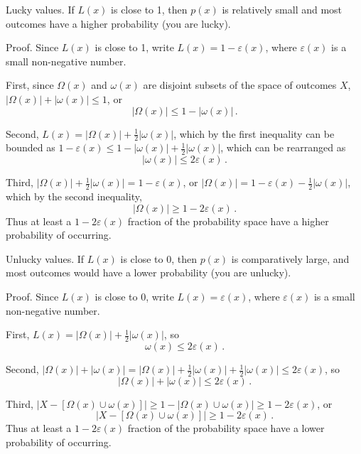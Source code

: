\begin{theorem}{Lucky values.}
\label{thm:lucky}
If $L(x)$ is close to 1, then $p(x)$ is relatively small and most outcomes have a higher probability (you are lucky).

Proof.  Since $L(x)$ is close to 1, write $L(x)=1-\varepsilon(x)$, where $\varepsilon(x)$ is a small non-negative number.

First, since $\Omega(x)$ and $\omega(x)$ are disjoint subsets of the space of outcomes $X$, $|\Omega(x)|+|\omega(x)| \leq 1$, or 
\begin{equation*}
|\Omega(x)| \leq 1-|\omega(x)| \,.
\end{equation*}

Second, $L(x)=|\Omega(x)|+\frac{1}{2}|\omega(x)|$, which by the first inequality can be bounded as $1-\varepsilon(x)\leq  1-|\omega(x)|+\frac{1}{2}|\omega(x)|$, which can be rearranged as
\begin{equation*}
|\omega(x)| \leq 2 \varepsilon(x) \,.
\end{equation*}

Third, $|\Omega(x)|+\frac{1}{2}|\omega(x)| = 1-\varepsilon(x)$, or $|\Omega(x)|=1-\varepsilon(x)-\frac{1}{2}|\omega(x)|$, which by the second inequality,
\begin{equation}
|\Omega(x)| \geq 1-2 \varepsilon(x) \,.
\end{equation}
Thus at least a $1-2 \varepsilon(x)$ fraction of the probability space have a higher probability of occurring.
\end{theorem}

\begin{theorem}{Unlucky values.}
\label{thm:unlucky}
If $L(x)$ is close to 0, then $p(x)$ is comparatively large, and most outcomes would have a lower probability (you are unlucky).

Proof.  Since $L(x)$ is close to 0, write $L(x)=\varepsilon(x)$, where $\varepsilon(x)$ is a small non-negative number.

First, $L(x)=|\Omega(x)|+\frac{1}{2}|\omega(x)|$, so
\begin{equation*}
\omega(x) \leq 2\varepsilon(x) \,.
\end{equation*}

Second, $|\Omega(x)|+|\omega(x)|=|\Omega(x)|+\frac{1}{2}|\omega(x)|+\frac{1}{2}|\omega(x)| \leq 2\varepsilon(x)$, so
\begin{equation*}
|\Omega(x)|+|\omega(x)| \leq 2\varepsilon(x) \,.
\end{equation*}

Third, $|X-[\Omega(x) \cup \omega(x)]| \geq 1-|\Omega(x) \cup \omega(x)| \geq 1-2\varepsilon(x)$, or 
\begin{equation*}
|X-[\Omega(x) \cup \omega(x)]| \geq 1-2\varepsilon(x) \,.
\end{equation*}
Thus at least a $1-2 \varepsilon(x)$ fraction of the probability space have a lower probability of occurring.
\end{theorem}


